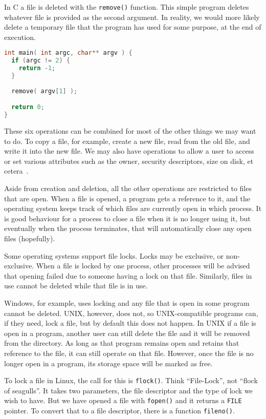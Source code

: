 In C a file is deleted with the \texttt{remove()} function. This simple program deletes whatever file is provided as the second argument. In reality, we would more likely delete a temporary file that the program has used for some purpose, at the end of execution.

\begin{lstlisting}[language=C]
int main( int argc, char** argv ) {
  if (argc != 2) {
    return -1;
  }
  
  remove( argv[1] );

  return 0;
}    
\end{lstlisting}


These six operations can be combined for most of the other things we may want to do. To copy a file, for example, create a new file, read from the old file, and write it into the new file. We may also have operations to allow a user to access or set various attributes such as the owner, security descriptors, size on disk, et cetera~\cite{osc}.

Aside from creation and deletion, all the other operations are restricted to files that are open. When a file is opened, a program gets a reference to it, and the operating system keeps track of which files are currently open in which process. It is good behaviour for a process to close a file when it is no longer using it, but eventually when the process terminates, that will automatically close any open files (hopefully).

Some operating systems support file locks. Locks may be exclusive, or non-exclusive. When a file is locked by one process, other processes will be advised that opening failed due to someone having a lock on that file. Similarly, files in use cannot be deleted while that file is in use.

Windows, for example, uses locking and any file that is open in some program cannot be deleted. UNIX, however, does not, so UNIX-compatible programs can, if they need, lock a file, but by default this does not happen. In UNIX if a file is open in a program, another user can still delete the file and it will be removed from the directory. As long as that program remains open and retains that reference to the file, it can still operate on that file. However, once the file is no longer open in a program, its storage space will be marked as free.

To lock a file in Linux, the call for this is \texttt{flock()}. Think ``File-Lock'', not ``flock of seagulls''. It takes two parameters, the file descriptor and the type of lock we wish to have. But we have opened a file with \texttt{fopen()} and it returns a \texttt{FILE} pointer. To convert that to a file descriptor, there is a function \texttt{fileno()}.

